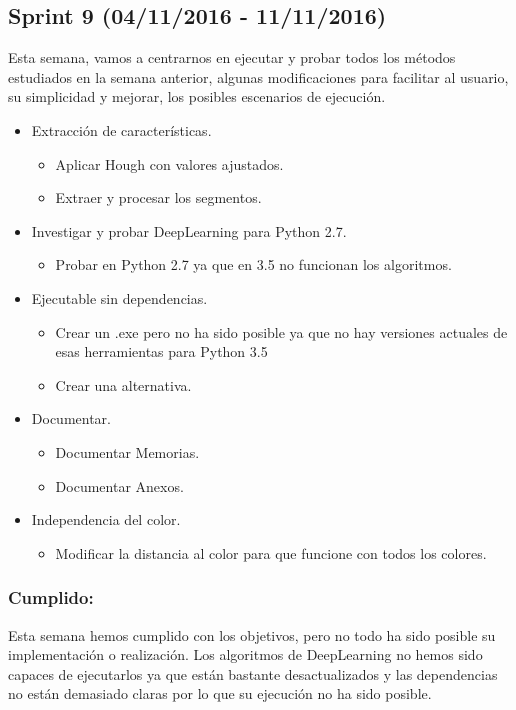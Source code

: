 \subsection{Sprint 9 (04/11/2016 - 11/11/2016)}

Esta semana, vamos a centrarnos en ejecutar y probar todos los métodos estudiados en la semana anterior, algunas modificaciones para facilitar al usuario, su simplicidad y mejorar, los posibles escenarios de ejecución.


\begin{itemize}
	\item Extracción de características.
		\begin{itemize}
			\item Aplicar Hough con valores ajustados.
			\item Extraer y procesar los segmentos.
		\end{itemize}
	\item Investigar y probar DeepLearning para Python 2.7.
		\begin{itemize}
			\item Probar en Python 2.7 ya que en 3.5 no funcionan los algoritmos.
		\end{itemize}
	\item Ejecutable sin dependencias.
		\begin{itemize}
			\item Crear un .exe pero no ha sido posible ya que no hay versiones actuales de esas herramientas para Python 3.5
			\item Crear una alternativa.
		\end{itemize}
	\item Documentar.
		\begin{itemize}
			\item Documentar Memorias. 
			\item Documentar Anexos.
		\end{itemize}
	\item Independencia del color.
		\begin{itemize}
			\item Modificar la distancia al color para que funcione con todos los colores.
		\end{itemize}
\end{itemize}

\subsubsection{Cumplido:}
Esta semana hemos cumplido con los objetivos, pero no todo ha sido posible su implementación o realización.
Los algoritmos de DeepLearning no hemos sido capaces de ejecutarlos ya que están bastante desactualizados y las dependencias no están demasiado claras por lo que su ejecución no ha sido posible.

